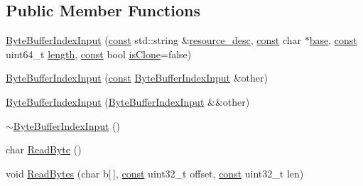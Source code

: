 \subsection*{Public Member Functions}
\begin{DoxyCompactItemize}
\item 
\mbox{\hyperlink{classlucene_1_1core_1_1store_1_1ByteBufferIndexInput_a3227090a947ac3f64f7fc1b3cff74a23}{Byte\+Buffer\+Index\+Input}} (\mbox{\hyperlink{ZlibCrc32_8h_a2c212835823e3c54a8ab6d95c652660e}{const}} std\+::string \&\mbox{\hyperlink{classlucene_1_1core_1_1store_1_1IndexInput_a5425147277f9cf9c08ba50e411c45473}{resource\+\_\+desc}}, \mbox{\hyperlink{ZlibCrc32_8h_a2c212835823e3c54a8ab6d95c652660e}{const}} char $\ast$\mbox{\hyperlink{classlucene_1_1core_1_1store_1_1ByteBufferIndexInput_a71a9d4cb7cb207d2db8f8ed32c9fcf2b}{base}}, \mbox{\hyperlink{ZlibCrc32_8h_a2c212835823e3c54a8ab6d95c652660e}{const}} uint64\+\_\+t \mbox{\hyperlink{classlucene_1_1core_1_1store_1_1ByteBufferIndexInput_acc7f63d7cbe6fe5047d6f2ef2d3f28bf}{length}}, \mbox{\hyperlink{ZlibCrc32_8h_a2c212835823e3c54a8ab6d95c652660e}{const}} bool \mbox{\hyperlink{classlucene_1_1core_1_1store_1_1ByteBufferIndexInput_a972eb08d337dcec62b415784f6aa2788}{is\+Clone}}=false)
\item 
\mbox{\hyperlink{classlucene_1_1core_1_1store_1_1ByteBufferIndexInput_a5e4992fba0cac1288d936dc61513e5a3}{Byte\+Buffer\+Index\+Input}} (\mbox{\hyperlink{ZlibCrc32_8h_a2c212835823e3c54a8ab6d95c652660e}{const}} \mbox{\hyperlink{classlucene_1_1core_1_1store_1_1ByteBufferIndexInput}{Byte\+Buffer\+Index\+Input}} \&other)
\item 
\mbox{\hyperlink{classlucene_1_1core_1_1store_1_1ByteBufferIndexInput_aa9222e521eef01670bc317dd5b1331a1}{Byte\+Buffer\+Index\+Input}} (\mbox{\hyperlink{classlucene_1_1core_1_1store_1_1ByteBufferIndexInput}{Byte\+Buffer\+Index\+Input}} \&\&other)
\item 
\mbox{\hyperlink{classlucene_1_1core_1_1store_1_1ByteBufferIndexInput_a36e5b0350f7d5dc61ebe63b5f328d714}{$\sim$\+Byte\+Buffer\+Index\+Input}} ()
\item 
char \mbox{\hyperlink{classlucene_1_1core_1_1store_1_1ByteBufferIndexInput_a0bad8b8c3af381ba0705f1b00fa56aee}{Read\+Byte}} ()
\item 
void \mbox{\hyperlink{classlucene_1_1core_1_1store_1_1ByteBufferIndexInput_abb72a44fc806fafc529b92d953b0007b}{Read\+Bytes}} (char b\mbox{[}$\,$\mbox{]}, \mbox{\hyperlink{ZlibCrc32_8h_a2c212835823e3c54a8ab6d95c652660e}{const}} uint32\+\_\+t offset, \mbox{\hyperlink{ZlibCrc32_8h_a2c212835823e3c54a8ab6d95c652660e}{const}} uint32\+\_\+t len)

\end{DoxyCompactItemize}
